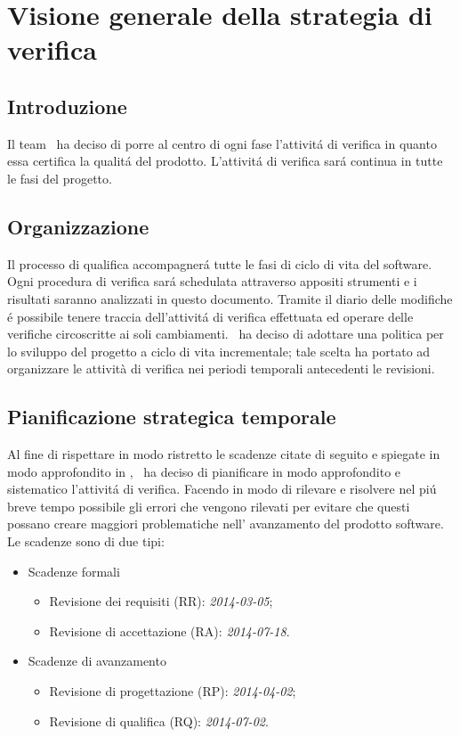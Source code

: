 \section{Visione generale della strategia di verifica}
\subsection{Introduzione}
Il team \gruppo ~ha deciso di porre al centro di ogni fase l'attivit\'a di verifica in quanto essa certifica la qualit\'a del prodotto. L'attivit\'a di verifica sar\'a continua in tutte le fasi del progetto.\\
\subsection{Organizzazione}
Il processo di qualifica accompagner\'a tutte le fasi di ciclo di vita del software. Ogni procedura di verifica sar\'a schedulata attraverso appositi strumenti e i risultati saranno analizzati in questo documento. Tramite il diario delle modifiche \'e possibile tenere traccia dell'attivit\'a di verifica effettuata ed operare delle verifiche circoscritte ai soli cambiamenti.
\gruppo ~ha deciso di adottare una politica per lo sviluppo del progetto a ciclo di vita incrementale; tale scelta ha portato ad organizzare le attività di verifica nei periodi temporali antecedenti le revisioni.
\subsection{Pianificazione strategica temporale}
Al fine di rispettare in modo ristretto le scadenze citate di seguito e spiegate in modo approfondito in \infoPDP, \gruppo ~ha deciso di pianificare in modo approfondito e sistematico l'attivit\'a di verifica. Facendo in modo di rilevare e risolvere nel pi\'u breve tempo possibile gli errori che vengono rilevati per evitare che questi possano creare maggiori problematiche nell' avanzamento del prodotto software. Le scadenze sono di due tipi:
\begin{itemize}
\item Scadenze formali
\begin{itemize}
\item Revisione dei requisiti (RR): \textit{2014-03-05};
\item Revisione di accettazione (RA): \textit{2014-07-18}.
\end{itemize}
\item Scadenze di avanzamento
\begin{itemize}
\item Revisione di progettazione (RP): \textit{2014-04-02};
\item Revisione di qualifica (RQ): \textit{2014-07-02}.
\end{itemize}
\end{itemize}
